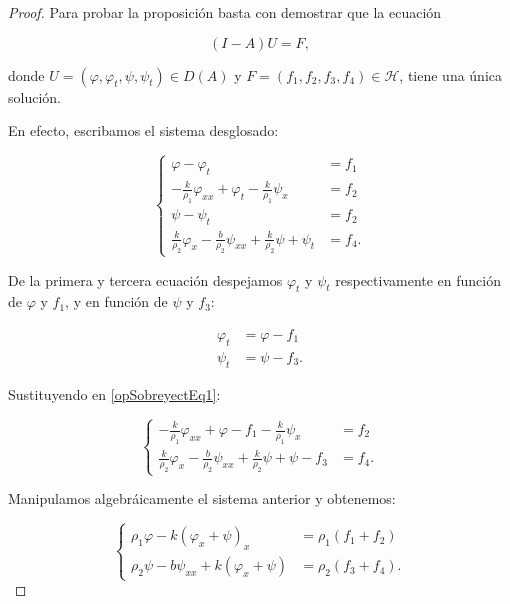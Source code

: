 \begin{proof}
    Para probar la proposición basta con demostrar que la ecuación

    \[(I-A)U = F,\]

    donde $U=(\varphi, \varphi_t, \psi, \psi_t) \in D(A)$ y $F = (f_1, f_2, f_3, f_4) \in \mathcal{H}$, tiene una única solución. 

    En efecto, escribamos el sistema desglosado:

    \begin{equation}
        \label{opSobreyectEq1}
        \begin{cases}
            \varphi - \varphi_t &= f_1\\
            -\frac{k}{\rho_1}\varphi_{xx} + \varphi_t - \frac{k}{\rho_1}\psi_x &= f_2\\
            \psi - \psi_t &= f_2\\
            \frac{k}{\rho_2}\varphi_x - \frac{b}{\rho_2}\psi_{xx} + \frac{k}{\rho_2}\psi + \psi_t &= f_4.
        \end{cases}
    \end{equation}

    De la primera y tercera ecuación despejamos $\varphi_t$ y $\psi_t$ respectivamente en función de $\varphi$ y $f_1$, y en función de $\psi$ y $f_3$:

    \begin{align*}
        \varphi_t &= \varphi - f_1\\
        \psi_t &= \psi - f_3.
    \end{align*}

    Sustituyendo en \eqref{opSobreyectEq1}:

    \begin{equation*}
        \begin{cases}
            -\frac{k}{\rho_1}\varphi_{xx} + \varphi - f_1 - \frac{k}{\rho_1}\psi_x &= f_2\\
            \frac{k}{\rho_2}\varphi_x - \frac{b}{\rho_2}\psi_{xx} + \frac{k}{\rho_2}\psi + \psi - f_3 &= f_4.
        \end{cases}
    \end{equation*}

    Manipulamos algebráicamente el sistema anterior y obtenemos:

    \begin{equation}
        \label{opSobreyectEq2}
        \begin{cases}
            \rho_1\varphi - k(\varphi_x + \psi)_x &= \rho_1(f_1 + f_2)\\
            \rho_2\psi - b\psi_{xx} + k(\varphi_x + \psi) &= \rho_2(f_3 + f_4).
        \end{cases}
    \end{equation}


\end{proof}
